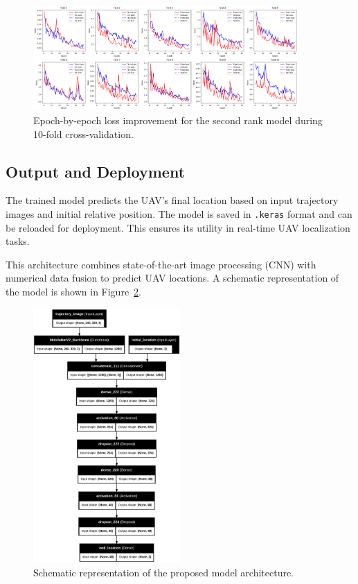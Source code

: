 \begin{figure}[H]
    \centering
    \includegraphics[width=0.9\textwidth]{Imgs/second_best_out.png}
    \caption{Epoch-by-epoch loss improvement for the second rank model during 10-fold cross-validation.}
    \label{fig:folds_second_best_model}
\end{figure}

\subsection{Output and Deployment}
The trained model predicts the UAV’s final location based on input trajectory images and initial 
relative position. The model is saved in \texttt{.keras} format and can be reloaded for deployment. This ensures its utility in real-time UAV localization tasks.

This architecture combines state-of-the-art image processing (CNN) with numerical data fusion to predict UAV locations. A schematic representation of the model is shown in Figure~\ref{fig:model_architecture}.

\begin{figure}[H]
    \centering
    \includegraphics[width=0.5\textwidth]{Imgs/cnn.png}
    \caption{Schematic representation of the proposed model architecture.}
    \label{fig:model_architecture}
\end{figure}


